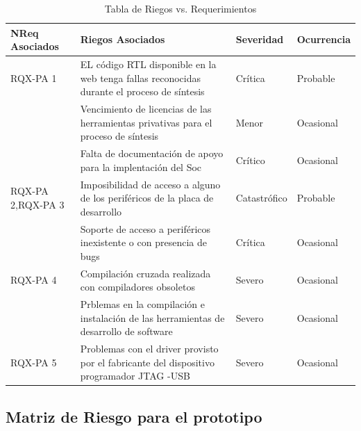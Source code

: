 \newpage
\begin{table}[!h]
		\centering
		\begin{tabular}{ p{2.5cm} p{9cm} p{2cm} p{2cm} }
		\hline 
		\rowcolor[gray]{0.8} N\textordmasculine Req Asociados& Riegos Asociados & Severidad  & Ocurrencia \\
		\hline
		RQX-PA 1& EL código RTL disponible en la web tenga  fallas reconocidas durante el proceso de síntesis & Crítica       & Probable \\
		\hline
				& Vencimiento de licencias de las herramientas privativas para el proceso de síntesis  & Menor  & Ocasional\\	 
		\hline
				& Falta de documentación de apoyo para la implentación
del Soc & Crítico & Ocasional\\	 
		\hline

		RQX-PA 2,RQX-PA 3 & Imposibilidad de acceso a alguno de los periféricos de la placa de desarrollo &  Catastrófico  & Probable\\
		\hline
		& Soporte de acceso a periféricos inexistente o con presencia
de bugs & Crítica  & Ocasional\\	 
		\hline
		RQX-PA 4& Compilación cruzada realizada con compiladores obsoletos & Severo  &  Ocasional\\ 
		\hline
		&Prblemas en la compilación e instalación de las herramientas de desarrollo de software  & Severo  &  Ocasional\\ 
		\hline
		RQX-PA 5&Problemas con el driver provisto por el fabricante del  dispositivo programador JTAG -USB  & Severo&  Ocasional\\
		\hline
		\hline
		\end{tabular}
		\caption{Tabla de Riegos vs. Requerimientos}
		\end{table}\subsection{Matriz de Riesgo para el prototipo}


